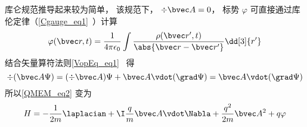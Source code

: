 
库仑规范推导起来较为简单， 该规范下， $\div \bvec A = 0$， 标势 $\varphi$ 可直接通过库伦定律（\autoref{Cgauge_eq1}~）计算
\begin{equation}
\varphi(\bvec r, t) = \frac{1}{4\pi\epsilon_0} \int \frac{\rho(\bvec r', t)}{\abs{\bvec r - \bvec r'}} \dd[3]{r'}
\end{equation}
结合矢量算符法则\autoref{VopEq_eq1}~ 得
\begin{equation}
\div (\bvec A \Psi) = (\div \bvec A) \Psi + \bvec A \vdot (\grad \Psi) = \bvec A \vdot (\grad \Psi)
\end{equation}
所以\autoref{QMEM_eq2} 变为
\begin{equation}\label{QMEM_eq4}
H = -\frac{1}{2m} \laplacian + \I \frac{q}{m} \bvec A \vdot \Nabla + \frac{q^2}{2m} \bvec A^2 + q\varphi
\end{equation}
